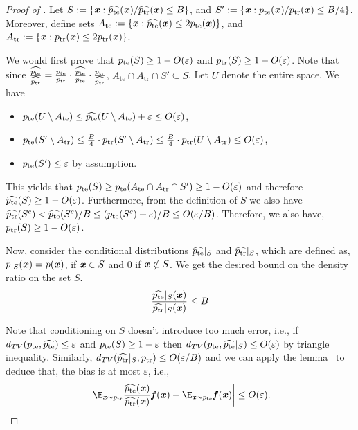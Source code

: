 \begin{proof}[Proof of ]
    Let $S := \{ \boldsymbol{\mathit{x}} : \widehat{p_{\mathrm{te}}}(\boldsymbol{\mathit{x}}) / \widehat{p_{\mathrm{tr}}}(\boldsymbol{\mathit{x}}) \leq B \}$, and $S' := \{\boldsymbol{\mathit{x}} : p_{\mathrm{te}}(\boldsymbol{\mathit{x}}) / p_{\mathrm{tr}}(\boldsymbol{\mathit{x}}) \leq B/4\}$. Moreover, define sets $A_{\mathrm{te}} := \{ \boldsymbol{\mathit{x}} : \widehat{p_{\mathrm{te}}}(\boldsymbol{\mathit{x}}) \leq 2 p_{\mathrm{te}}(\boldsymbol{\mathit{x}}) \}$, and $A_{\mathrm{tr}} := \{ \boldsymbol{\mathit{x}} : p_{\mathrm{tr}}(\boldsymbol{\mathit{x}}) \leq 2 p_{\mathrm{tr}}(\boldsymbol{\mathit{x}})\}$.

    We would first prove that $p_{\mathrm{te}}(S) \geq 1 - O(\varepsilon)$ and $p_{\mathrm{tr}}(S) \geq 1 - O(\varepsilon)$. Note that since $\frac{\widehat{p_{\mathrm{te}}}}{\widehat{p_{\mathrm{tr}}}} =  \frac{p_{\mathrm{te}}}{p_{\mathrm{tr}}}\cdot \frac{\widehat{p_{\mathrm{te}}}}{p_{\mathrm{te}}} \cdot \frac{p_{\mathrm{tr}}}{\widehat{p_{\mathrm{tr}}}}$, $A_{\mathrm{te}} \cap A_{\mathrm{tr}} \cap S' \subseteq S$. Let $U$ denote the entire space. We have
    \begin{itemize}
        \item $p_{\mathrm{te}}(U \setminus A_{\mathrm{te}}) \leq \widehat{p_{\mathrm{te}}}(U \setminus A_{\mathrm{te}}) + \varepsilon \leq O(\varepsilon)$,
        \item $p_{\mathrm{te}}(S' \setminus A_{\mathrm{tr}}) \leq \frac{B}{4} \cdot p_{\mathrm{tr}}(S' \setminus A_{\mathrm{tr}}) \leq \frac{B}{4}\cdot p_{\mathrm{tr}}(U \setminus A_{\mathrm{tr}}) \leq O(\varepsilon)$, 
        \item $p_{\mathrm{te}}(S') \leq \varepsilon$ by assumption.
    \end{itemize}
    This yields that $p_{\mathrm{te}}(S) \geq p_{\mathrm{te}}(A_{\mathrm{te}} \cap A_{\mathrm{tr}} \cap S') \geq 1 - O(\varepsilon)$ and therefore $\widehat{p_{\mathrm{te}}}(S) \geq 1 - O(\varepsilon)$. Furthermore, from the definition of $S$ we also have $\widehat{p_{\mathrm{tr}}}(S^c) < \widehat{p_{\mathrm{te}}}(S^c)/B \leq(p_{\mathrm{te}}(S^c) + \varepsilon)/B \leq O(\varepsilon/B)$. Therefore, we also have, ${p_{\mathrm{tr}}}(S)\geq 1-O(\varepsilon)$.

Now, consider the conditional distributions $\widehat{p_{\mathrm{te}}}|_S$ and $\widehat{p_{\mathrm{tr}}}|_S$, which are defined as, $p|_S(\boldsymbol{\mathit{x}}) = p(\boldsymbol{\mathit{x}})$, if $\boldsymbol{\mathit{x}}\in S$ and $0$ if $\boldsymbol{\mathit{x}}\notin S$. We get the desired bound on the density ratio on the set $S$.
    \begin{equation*}
        \frac{\widehat{p_{\mathrm{te}}}|_S(\boldsymbol{\mathit{x}})}{\widehat{p_{\mathrm{tr}}}|_S(\boldsymbol{\mathit{x}})} \leq  B 
    \end{equation*}

    
    Note that conditioning on $S$ doesn't introduce too much error, i.e., if $d_{TV}(p_{\mathrm{te}}, \widehat{p_{\mathrm{te}}}) \leq \varepsilon$ and $p_{\mathrm{te}}(S) \geq 1-\varepsilon$ then $d_{TV}(p_{\mathrm{te}}, \widehat{p_{\mathrm{te}}}|_S) \leq O(\varepsilon)$ by triangle inequality. Similarly, $d_{TV}(\widehat{p_{\mathrm{tr}}}|_S, p_{\mathrm{tr}}) \leq O(\varepsilon/B)$ and we can apply the lemma~ to deduce that,
    the bias is at most $\varepsilon$, i.e.,
     \[
        \left|\E_{\xx\sim \ptr} \frac{\widehat{\pte}(\xx)}{\widehat{\ptr}(\xx)} \ff(\xx) - \E_{\xx\sim \pte} \ff(\xx)\right| \leq O(\varepsilon).
\]
    

\end{proof}
